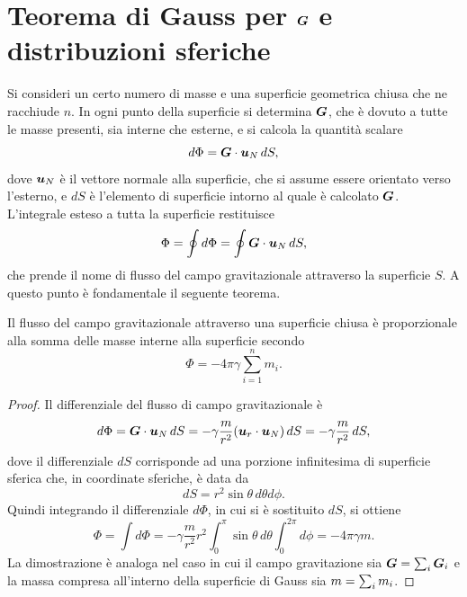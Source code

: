 \section{Teorema di Gauss per \texorpdfstring{$\bm{G}$}{G} e distribuzioni sferiche}
Si consideri un certo numero di masse e una superficie geometrica chiusa che ne racchiude $n$. In ogni punto della superficie si determina $\bm{G}$, che è dovuto a tutte le masse presenti, sia interne che esterne, e si calcola la quantità scalare
\begin{equation}
    d\Phi=\bm{G}\cdot\bm{u}_N\,dS,
\end{equation}
dove $\bm{u}_N$ è il vettore normale alla superficie, che si assume essere orientato verso l'esterno, e $dS$ è l'elemento di superficie intorno al quale è calcolato $\bm{G}$. L'integrale esteso a tutta la superficie restituisce 
\begin{equation}
    \Phi=\oint d\Phi=\oint\bm{G}\cdot\bm{u}_N\,dS,
\end{equation}
che prende il nome di flusso del campo gravitazionale attraverso la superficie $S$. A questo punto è fondamentale il seguente teorema.
\begin{teo}
    Il flusso del campo gravitazionale attraverso una superficie chiusa è proporzionale alla somma delle masse interne alla superficie secondo
    \begin{equation}
        \Phi=-4\pi\gamma\sum_{i=1}^nm_i.
    \end{equation}
\end{teo}
\begin{proof}
    Il differenziale del flusso di campo gravitazionale è
    \begin{equation}
        d\Phi=\bm{G}\cdot\bm{u}_N\,dS=-\gamma\frac{m}{r^2}(\bm{u}_r\cdot\bm{u}_N)\,dS=-\gamma\frac{m}{r^2}\,dS,
    \end{equation}
    dove il differenziale $dS$ corrisponde ad una porzione infinitesima di superficie sferica che, in coordinate sferiche, è data da
    \begin{equation}
        dS=r^2\sin{\theta}\,d\theta d\phi.
    \end{equation}
    Quindi integrando il differenziale $d\Phi$, in cui si è sostituito $dS$, si ottiene
    \begin{equation}
        \Phi=\int d\Phi=-\gamma\frac{m}{r^2}r^2\int_0^{\pi}\sin{\theta}\,d\theta\int_0^{2\pi}d\phi=-4\pi\gamma m.
    \end{equation}
    La dimostrazione è analoga nel caso in cui il campo gravitazione sia $\bm{G}=\sum\nolimits_i\bm{G}_i$ e la massa compresa all'interno della superficie di Gauss sia $m=\sum\nolimits_im_i$. 
\end{proof}
